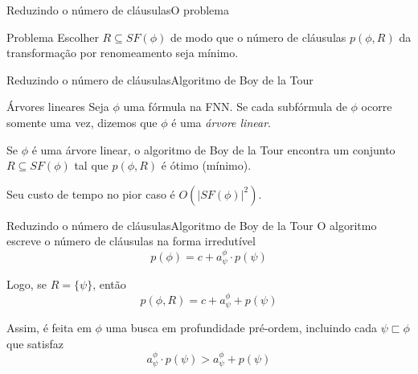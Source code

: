 \begin{frame}{Reduzindo o número de cláusulas}{O problema}
	\begin{block}{Problema}
		Escolher $R \subseteq SF(\phi)$ de modo que o número de cláusulas $p(\phi,R)$ da transformação por renomeamento seja mínimo.
	\end{block}
\end{frame}

\begin{frame}{Reduzindo o número de cláusulas}{Algoritmo de Boy de la Tour}
	\begin{block}{Árvores lineares}
		Seja $\phi$ uma fórmula na FNN. Se cada subfórmula de $\phi$ ocorre somente uma vez, dizemos que $\phi$ é uma \emph{árvore linear}.
	\end{block}
	
	\pause Se $\phi$ é uma árvore linear, o algoritmo de Boy de la Tour encontra um conjunto $R \subseteq SF(\phi)$ tal que $p(\phi,R)$ é ótimo (mínimo).
	
	\vspace{.1cm}
	\pause Seu custo de tempo no pior caso é $O(|SF(\phi)|^2)$.
\end{frame}

\begin{frame}{Reduzindo o número de cláusulas}{Algoritmo de Boy de la Tour}
	O algoritmo escreve o número de cláusulas na forma irredutível $$p(\phi) = c + a_\psi^\phi \cdot p(\psi)$$
	
	\pause Logo, se $R = \{\psi \}$, então $$p(\phi,R) = c + a_\psi^\phi + p(\psi)$$
	
	\pause Assim, é feita em $\phi$ uma busca em profundidade pré-ordem, incluindo cada $\psi \sqsubset \phi$ que satisfaz $$a_\psi^\phi \cdot p(\psi) > a_\psi^\phi + p(\psi)$$
\end{frame}

